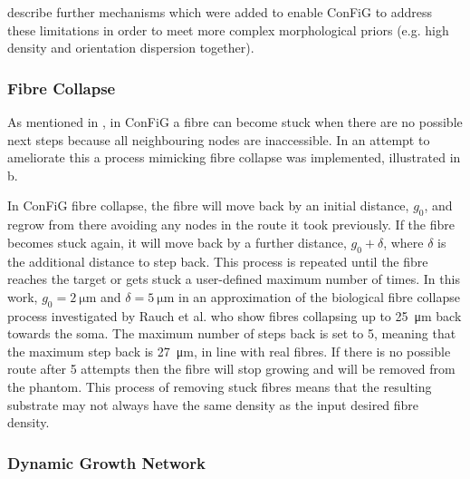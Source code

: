 describe further mechanisms which were added to enable ConFiG to address these limitations in order to meet more complex morphological priors (e.g. high density and orientation dispersion together).

\subsubsection{Fibre Collapse}
\label{sec:config_fibre_collapse}
As mentioned in , in ConFiG a fibre can become stuck when there are no possible next steps because all neighbouring nodes are inaccessible. In an attempt to ameliorate this a process mimicking fibre collapse was implemented, illustrated in b.

In ConFiG fibre collapse, the fibre will move back by an initial distance, $g_0$, and regrow from there avoiding any nodes in the route it took previously. If the fibre becomes stuck again, it will move back by a further distance, $g_0+ \delta$, where $\delta$ is the additional distance to step back. This process is repeated until the fibre reaches the target or gets stuck a user-defined maximum number of times. In this work, $g_0=\SI{2}{\micro\metre}$  and $\delta=\SI{5}{\micro\metre}$ in an approximation of the biological fibre collapse process investigated by Rauch et al. \cite{Rauch2013} who show fibres collapsing up to \SI{25}{\micro\metre} back towards the soma. The maximum number of steps back is set to 5, meaning that the maximum step back is \SI{27}{\micro\metre}, in line with real fibres. If there is no possible route after 5 attempts then the fibre will stop growing and will be removed from the phantom. This process of removing stuck fibres means that the resulting substrate may not always have the same density as the input desired fibre density.

\subsubsection{Dynamic Growth Network}
\label{sec:config_dynam_growth}


